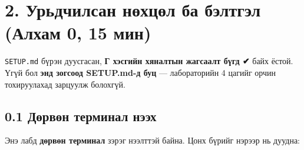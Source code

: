 \hypertarget{ux443ux440ux44cux434ux447ux438ux43bux441ux430ux43d-ux43dux4e9ux445ux446ux4e9ux43b-ux431ux430-ux431ux44dux43bux442ux433ux44dux43b-ux430ux43bux445ux430ux43c-0-15-ux43cux438ux43d}{%
\section{2. Урьдчилсан нөхцөл ба бэлтгэл (Алхам 0, 15 мин)}\label{ux443ux440ux44cux434ux447ux438ux43bux441ux430ux43d-ux43dux4e9ux445ux446ux4e9ux43b-ux431ux430-ux431ux44dux43bux442ux433ux44dux43b-ux430ux43bux445ux430ux43c-0-15-ux43cux438ux43d}}

\texttt{SETUP.md} бүрэн дуусгасан, \textbf{Г хэсгийн хяналтын жагсаалт бүгд ✔} байх ёстой. Үгүй бол \textbf{энд зогсоод SETUP.md-д буц} --- лабораторийн 4 цагийг орчин тохируулахад зарцуулж болохгүй.

\hypertarget{ux434ux4e9ux440ux432ux4e9ux43d-ux442ux435ux440ux43cux438ux43dux430ux43b-ux43dux44dux44dux445}{%
\subsection{0.1 Дөрвөн терминал нээх}\label{ux434ux4e9ux440ux432ux4e9ux43d-ux442ux435ux440ux43cux438ux43dux430ux43b-ux43dux44dux44dux445}}

Энэ лабд \textbf{дөрвөн терминал} зэрэг нээлттэй байна. Цонх бүрийг нэрээр нь дуудна:

